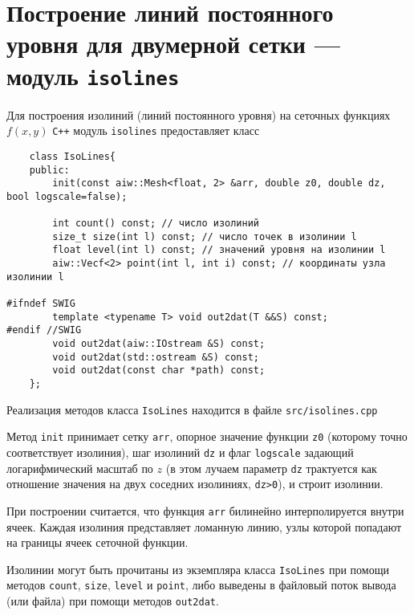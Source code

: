 \section{Построение линий постоянного уровня для двумерной сетки --- модуль {\tt isolines}}
Для построения изолиний (линий постоянного уровня) на сеточных функциях $f(x,y)$ \verb'C++' модуль
\verb'isolines' предоставляет класс
\begin{verbatim}
    class IsoLines{
    public:
        init(const aiw::Mesh<float, 2> &arr, double z0, double dz, bool logscale=false);
		
        int count() const; // число изолиний
        size_t size(int l) const; // число точек в изолинии l
        float level(int l) const; // значений уровня на изолинии l
        aiw::Vecf<2> point(int l, int i) const; // координаты узла изолинии l

#ifndef SWIG
        template <typename T> void out2dat(T &&S) const;
#endif //SWIG
        void out2dat(aiw::IOstream &S) const;        
        void out2dat(std::ostream &S) const;
        void out2dat(const char *path) const;
	};
\end{verbatim}
Реализация методов класса \verb'IsoLines' находится в файле \verb'src/isolines.cpp'

Метод \verb'init' принимает сетку \verb'arr', опорное значение функции \verb'z0' (которому точно соответствует изолиния),
шаг изолиний \verb'dz' и флаг \verb'logscale' задающий логарифмический масштаб по $z$ (в этом лучаем параметр \verb'dz' трактуется как
отношение значения на двух соседних изолиниях, \verb'dz>0'), и строит изолинии.

При построении считается, что функция \verb'arr' билинейно интерполируется внутри ячеек. Каждая изолиния представляет ломанную линию,
узлы которой попадают на границы ячеек сеточной функции.

Изолинии могут быть прочитаны из экземпляра класса \verb'IsoLines' при помощи методов \verb'count', \verb'size', \verb'level' и \verb'point',
либо выведены в файловый поток вывода (или файла) при помощи методов \verb'out2dat'.
